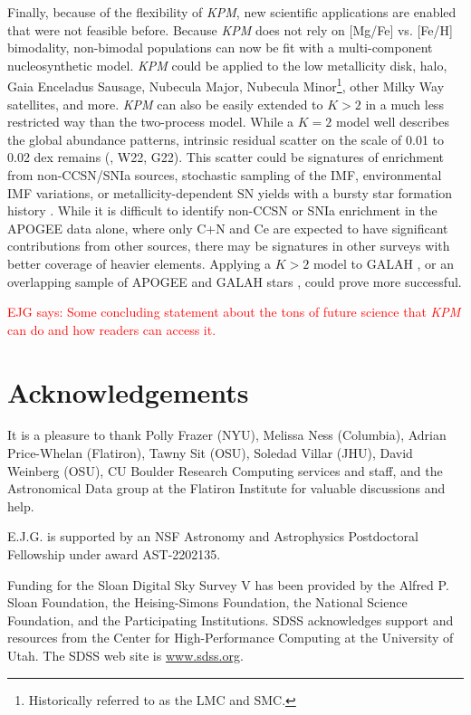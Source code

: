 \documentclass[modern]{aastex631}
\newcommand{\ejg}[1]{\textcolor{red}{EJG says: #1}}
\newcommand{\name}{\textsl{KPM}}
\begin{document}
Finally, because of the flexibility of \name{}, new scientific applications are enabled that were not feasible before. Because \name{} does not rely on [Mg/Fe] vs. [Fe/H] bimodality, non-bimodal populations can now be fit with a multi-component nucleosynthetic model. \name{} could be applied to the low metallicity disk, halo, Gaia Enceladus Sausage, Nubecula Major, Nubecula Minor\footnote{Historically referred to as the LMC and SMC.}, other Milky Way satellites, and more. \name{} can also be easily extended to $K>2$ in a much less restricted way than the two-process model. While a $K=2$ model well describes the global abundance patterns, intrinsic residual scatter on the scale of 0.01 to 0.02 dex remains (\citealp{ting2022}, W22, G22). This scatter could be signatures of enrichment from non-CCSN/SNIa sources, stochastic sampling of the IMF, environmental IMF variations, or metallicity-dependent SN yields with a bursty star formation history \citep[e.g.][]{belokurov2022, griffith2023}. While it is difficult to identify non-CCSN or SNIa enrichment in the APOGEE data alone, where only C+N and Ce are expected to have significant contributions from other sources, there may be signatures in other surveys with better coverage of heavier elements. Applying a $K>2$ model to GALAH \citep{buder2021}, or an overlapping sample of APOGEE and GALAH stars \citep{nandakumar2022}, could prove more successful.

\ejg{Some concluding statement about the tons of future science that \name{} can do and how readers can access it.}

\section{Acknowledgements}
It is a pleasure to thank
  Polly Frazer (NYU),
  Melissa Ness (Columbia),
  Adrian Price-Whelan (Flatiron),
  Tawny Sit (OSU),
  Soledad Villar (JHU),
  David Weinberg (OSU),
  CU Boulder Research Computing services and staff,
  and the Astronomical Data group at the Flatiron Institute
for valuable discussions and help.

E.J.G. is supported by an NSF Astronomy and Astrophysics Postdoctoral Fellowship under award AST-2202135.

Funding for the Sloan Digital Sky Survey V has been provided by the Alfred P. Sloan Foundation, the Heising-Simons Foundation, the National Science Foundation, and the Participating Institutions. SDSS acknowledges support and resources from the Center for High-Performance Computing at the University of Utah. The SDSS web site is \url{www.sdss.org}.
\end{document}
